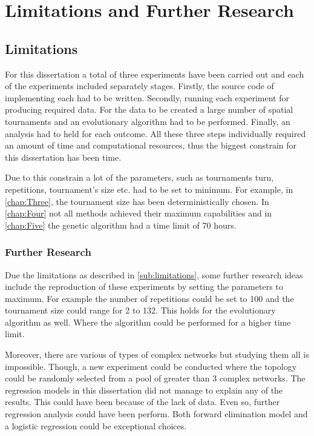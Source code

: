 \section{Limitations and Further Research}
\subsection{Limitations}
\label{sub:limitations}
For this dissertation a total of three experiments have been carried out and
each of the experiments included separately stages. Firstly, the source code of implementing
each had to be written. Secondly, running each experiment for producing required data.
For the data to be created a large number of spatial
tournaments and an evolutionary algorithm had to be performed. Finally, an
analysis had to held for each outcome. All these three steps individually required
an amount of time and computational resources, thus the biggest constrain for
this dissertation has been time.

Due to this constrain a lot of the parameters, such as tournaments turn, repetitions,
tournament's size etc. had to be set to minimum. For example, in \autoref{chap:Three},
the tournament size has been deterministically chosen. In \autoref{chap:Four}
not all methods achieved their maximum capabilities and in \autoref{chap:Five} the
genetic algorithm had a time limit of 70 hours.

\subsubsection{Further Research}

Due the limitations as described in \autoref{sub:limitations}, some further
research ideas include the reproduction of these experiments by setting the
parameters to maximum. For example the number of repetitions could be set to 100
and the tournament size could range for 2 to 132. This holds for the evolutionary
algorithm as well. Where the algorithm could be performed for a higher time limit.

Moreover, there are various of types of complex networks but studying them all
is impossible. Though, a new experiment could be conducted where the topology
could be randomly selected from a pool of greater than 3 complex networks. The
regression models in this dissertation did not manage to explain any of the results.
This could have been because of the lack of data. Even so, further regression
analysis could have been perform. Both forward elimination model and a logistic
regression could be exceptional choices.

